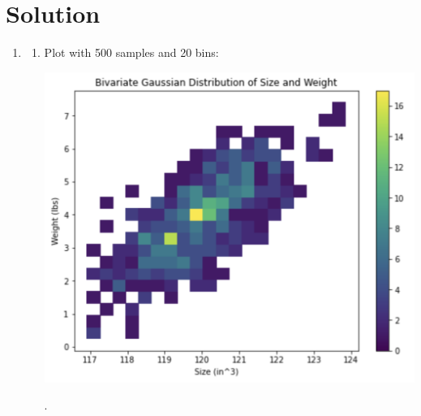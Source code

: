 \documentclass{harvardml}
\theoremstyle{definition}
\theoremstyle{plain}
\newenvironment{solution}
  {\color{blue}\section*{Solution}}
{}
\begin{document}
\begin{solution}
\begin{enumerate}
    \item \begin{enumerate}
        \item Plot with 500 samples and 20 bins: \begin{center}
        \includegraphics[scale=0.7]{3.1.png}
    \end{center}.


\end{enumerate}
\end{enumerate}
\end{solution}
\end{document}
